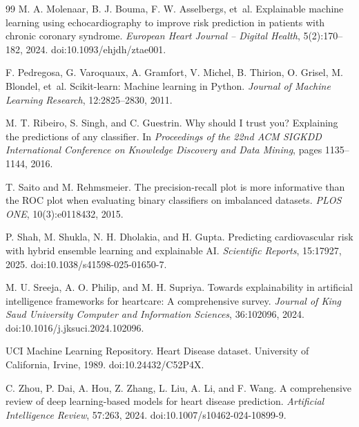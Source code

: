 \documentclass[10pt]{article}
\begin{document}
{\begin{thebibliography}{99}
M. A. Molenaar, B. J. Bouma, F. W. Asselbergs, et~al.
\newblock Explainable machine learning using echocardiography to improve risk prediction in patients with chronic coronary syndrome.
\newblock \emph{European Heart Journal -- Digital Health}, 5(2):170--182, 2024. doi:10.1093/ehjdh/ztae001.

F. Pedregosa, G. Varoquaux, A. Gramfort, V. Michel, B. Thirion, O. Grisel, M. Blondel, et~al.
\newblock Scikit-learn: Machine learning in Python.
\newblock \emph{Journal of Machine Learning Research}, 12:2825--2830, 2011.

M. T. Ribeiro, S. Singh, and C. Guestrin.
\newblock Why should I trust you? Explaining the predictions of any classifier.
\newblock In \emph{Proceedings of the 22nd ACM SIGKDD International Conference on Knowledge Discovery and Data Mining}, pages 1135--1144, 2016.

T. Saito and M. Rehmsmeier.
\newblock The precision-recall plot is more informative than the ROC plot when evaluating binary classifiers on imbalanced datasets.
\newblock \emph{PLOS ONE}, 10(3):e0118432, 2015.

P. Shah, M. Shukla, N. H. Dholakia, and H. Gupta.
\newblock Predicting cardiovascular risk with hybrid ensemble learning and explainable AI.
\newblock \emph{Scientific Reports}, 15:17927, 2025. doi:10.1038/s41598-025-01650-7.

M. U. Sreeja, A. O. Philip, and M. H. Supriya.
\newblock Towards explainability in artificial intelligence frameworks for heartcare: A comprehensive survey.
\newblock \emph{Journal of King Saud University Computer and Information Sciences}, 36:102096, 2024. doi:10.1016/j.jksuci.2024.102096.

UCI Machine Learning Repository.
\newblock Heart Disease dataset.
\newblock University of California, Irvine, 1989. doi:10.24432/C52P4X.

C. Zhou, P. Dai, A. Hou, Z. Zhang, L. Liu, A. Li, and F. Wang.
\newblock A comprehensive review of deep learning-based models for heart disease prediction.
\newblock \emph{Artificial Intelligence Review}, 57:263, 2024. doi:10.1007/s10462-024-10899-9.

\end{thebibliography}}
\end{document}
